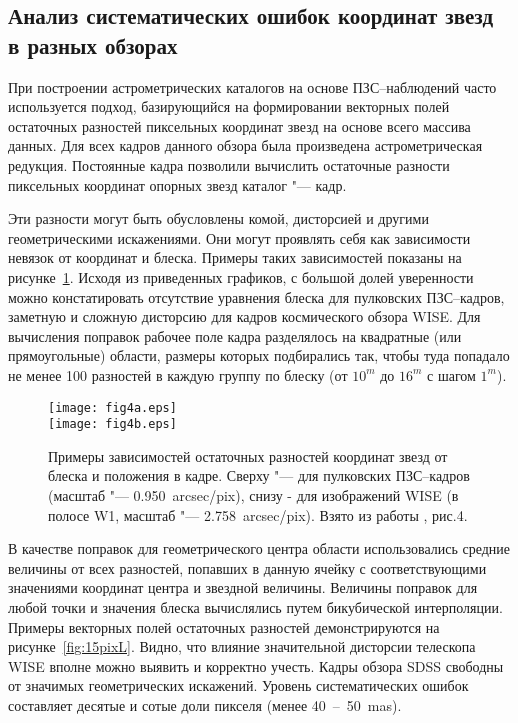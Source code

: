 \subsection{Анализ систематических ошибок координат звезд в разных обзорах} \label{subsec:ch3/sect2/sub4}
При построении астрометрических каталогов на основе ПЗС--наблюдений часто используется подход, базирующийся на формировании векторных полей остаточных разностей пиксельных координат звезд на основе всего массива данных. Для всех кадров данного обзора была произведена астрометрическая редукция. Постоянные кадра позволили вычислить остаточные разности пиксельных координат опорных звезд \glqq каталог "--- кадр\grqq .

Эти разности могут быть обусловлены комой, дисторсией и другими геометрическими искажениями. Они могут проявлять себя как зависимости невязок от координат и блеска. Примеры таких зависимостей показаны на рисунке~\ref{fig:15posL}. Исходя из приведенных графиков, с большой долей уверенности можно констатировать отсутствие уравнения блеска для пулковских ПЗС--кадров, заметную и сложную дисторсию для кадров космического обзора WISE. Для вычисления поправок рабочее поле кадра разделялось на квадратные (или прямоугольные) области, размеры которых подбирались так, чтобы туда попадало не менее 100 разностей в каждую группу по блеску (от $10^m$ до $16^m$ с шагом $1^m$).

\begin{figure}[h]
\centering
\texttt{[image: fig4a.eps]}\\
\texttt{[image: fig4b.eps]}
\caption{Примеры зависимостей остаточных разностей координат звезд от блеска и положения в кадре. Сверху "--- для пулковских ПЗС--кадров (масштаб "--- 0.950~arcsec/pix), снизу - для изображений WISE (в полосе W1, масштаб "--- 2.758~arcsec/pix). Взято из работы \cite{2015AstL...41..833K}, рис.4.}
\label{fig:15posL}
\end{figure}

В качестве поправок для геометрического центра области использовались средние величины от всех разностей, попавших в данную ячейку с соответствующими значениями координат центра и звездной величины. Величины поправок для любой точки и значения блеска вычислялись путем бикубической интерполяции. Примеры векторных полей остаточных разностей демонстрируются на рисунке~\ref{fig:15pixL}. Видно, что влияние значительной дисторсии телескопа WISE вполне можно выявить и корректно учесть. Кадры обзора SDSS свободны от значимых геометрических искажений. Уровень систематических ошибок составляет десятые и сотые доли пикселя (менее 40~--~50~mas).

